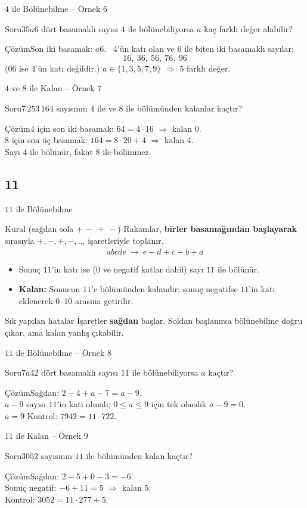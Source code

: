 \documentclass[aspectratio=169,11pt]{beamer}
\newcommand{\soru}[3]{%
\begin{frame}{#1}
  \begin{block}{Soru}\large #2\end{block}
  \pause
  \begin{exampleblock}{Çözüm}\large #3\end{exampleblock}
\end{frame}}
\newcommand{\ab}[1]{\overline{#1}}
\begin{document}
\soru{\(4\) ile Bölünebilme -- Örnek 6}
{\(\ab{35a6}\) dört basamaklı sayısı \(4\) ile bölünebiliyorsa \(a\) kaç farklı değer alabilir?}
{Son iki basamak: \(\ab{a6}\). \ \(4\)'ün katı olan ve \(6\) ile biten iki basamaklı sayılar:
\[16,\ 36,\ 56,\ 76,\ 96\]
(\(06\) ise \(4\)'ün katı değildir.) \(a\in\{1,3,5,7,9\}\) \(\Rightarrow\) \(5\) farklı değer.}

\soru{\(4\) ve \(8\) ile Kalan -- Örnek 7}
{\(7\,253\,164\) sayısının \(4\) ile ve \(8\) ile bölümünden kalanlar kaçtır?}
{\(4\) için son iki basamak: \(64=4\cdot 16\) \(\Rightarrow\) kalan \(0\).\\[3pt]
\(8\) için son üç basamak: \(164=8\cdot 20+4\) \(\Rightarrow\) kalan \(4\).\\[3pt]
Sayı \(4\) ile bölünür, fakat \(8\) ile bölünmez.}

\subsection{11}
\begin{frame}{\(11\) ile Bölünebilme}
\begin{block}{Kural (sağdan sola \(+\,-\,+\,-\))}
Rakamlar, \textbf{birler basamağından başlayarak} sırasıyla \(+,-,+,-,\dots\) işaretleriyle toplanır.
\[\ab{abcde}\ \longrightarrow\ e-d+c-b+a\]
\begin{itemize}
\item Sonuç \(11\)'in katı ise (\(0\) ve negatif katlar dahil) sayı \(11\) ile bölünür.
\item \textbf{Kalan:} Sonucun \(11\)'e bölümünden kalandır; sonuç negatifse \(11\)'in katı eklenerek \(0\)--\(10\) arasına getirilir.
\end{itemize}
\end{block}
\begin{alertblock}{Sık yapılan hatalar}
İşaretler \textbf{sağdan} başlar. Soldan başlanırsa bölünebilme doğru çıkar, ama kalan yanlış çıkabilir.
\end{alertblock}
\end{frame}

\soru{\(11\) ile Bölünebilme -- Örnek 8}
{\(\ab{7a42}\) dört basamaklı sayısı \(11\) ile bölünebiliyorsa \(a\) kaçtır?}
{Sağdan: \(2-4+a-7=a-9\).\\[3pt]
\(a-9\) sayısı \(11\)'in katı olmalı; \(0\le a\le 9\) için tek olasılık \(a-9=0\).\\[3pt]
\(a=9\) \quad Kontrol: \(7942=11\cdot 722\).}

\soru{\(11\) ile Kalan -- Örnek 9}
{\(3052\) sayısının \(11\) ile bölümünden kalan kaçtır?}
{Sağdan: \(2-5+0-3=-6\).\\[3pt]
Sonuç negatif: \(-6+11=5\) \(\Rightarrow\) kalan \(5\).\\[3pt]
Kontrol: \(3052=11\cdot 277+5\).}
\end{document}
